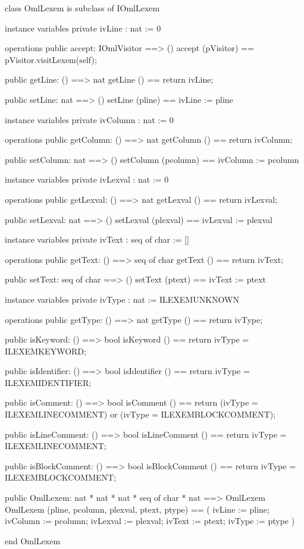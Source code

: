 \begin{vdm_al}
class OmlLexem is subclass of IOmlLexem

instance variables
  private ivLine : nat := 0

operations
  public accept: IOmlVisitor ==> ()
  accept (pVisitor) == pVisitor.visitLexem(self);

  public getLine: () ==> nat
  getLine () == return ivLine;

  public setLine: nat ==> ()
  setLine (pline) == ivLine := pline

instance variables
  private ivColumn : nat := 0

operations
  public getColumn: () ==> nat
  getColumn () == return ivColumn;

  public setColumn: nat ==> ()
  setColumn (pcolumn) == ivColumn := pcolumn

instance variables
  private ivLexval : nat := 0

operations
  public getLexval: () ==> nat
  getLexval () == return ivLexval;

  public setLexval: nat ==> ()
  setLexval (plexval) == ivLexval := plexval

instance variables
  private ivText : seq of char := []

operations
  public getText: () ==> seq of char
  getText () == return ivText;

  public setText: seq of char ==> ()
  setText (ptext) == ivText := ptext

instance variables
  private ivType : nat := ILEXEMUNKNOWN

operations
  public getType: () ==> nat
  getType () == return ivType;

  public isKeyword: () ==> bool
  isKeyword () == return ivType = ILEXEMKEYWORD;

  public isIdentifier: () ==> bool
  isIdentifier () == return ivType = ILEXEMIDENTIFIER;

  public isComment: () ==> bool
  isComment () == return (ivType = ILEXEMLINECOMMENT) or (ivType = ILEXEMBLOCKCOMMENT);

  public isLineComment: () ==> bool
  isLineComment () == return ivType = ILEXEMLINECOMMENT;

  public isBlockComment: () ==> bool
  isBlockComment () == return ivType = ILEXEMBLOCKCOMMENT;

  public OmlLexem: nat * nat * nat * seq of char * nat ==> OmlLexem
  OmlLexem (pline, pcolumn, plexval, ptext, ptype) ==
    ( ivLine := pline;
      ivColumn := pcolumn;
      ivLexval := plexval;
      ivText := ptext;
      ivType := ptype )

end OmlLexem
\end{vdm_al}
